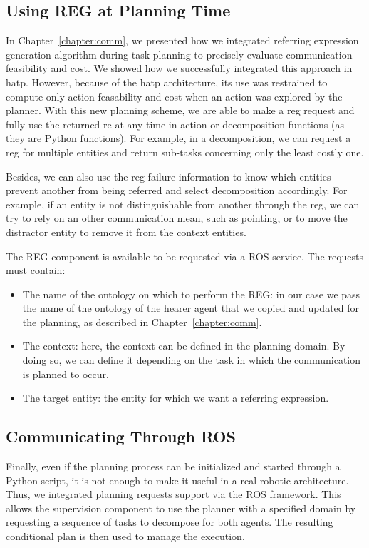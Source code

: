 \documentclass[a4paper,11pt,twoside]{StyleThese}
\begin{document}
\subsection{Using REG at Planning Time}
In Chapter~\ref{chapter:comm}, we presented how we integrated referring expression generation algorithm during task planning to precisely evaluate communication feasibility and cost. We showed how we successfully integrated this approach in \acrshort{hatp}. However, because of the \acrshort{hatp} architecture, its use was restrained to compute only action feasability and cost when an action was explored by the planner.
With this new planning scheme, we are able to make a \acrshort{reg} request and fully use the returned \acrshort{re} at any time in action or decomposition functions (as they are Python functions). For example, in a decomposition, we can request a \acrshort{reg} for multiple entities and return sub-tasks concerning only the least costly one. 

Besides, we can also use the \acrshort{reg} failure information to know which entities prevent another from being referred and select decomposition accordingly. For example, if an entity is not distinguishable from another through the \acrshort{reg}, we can try to rely on an other communication mean, such as pointing, or to move the distractor entity to remove it from the context entities.

The REG component is available to be requested via a ROS service. The requests must contain:
\begin{itemize}
\item The name of the ontology on which to perform the REG: in our case we pass the name of the ontology of the hearer agent that we copied and updated for the planning, as described in Chapter~\ref{chapter:comm}.

\item The context: here, the context can be defined in the planning domain. By doing so, we can define it depending on the task in which the communication is planned to occur.

\item The target entity: the entity for which we want a referring expression.
\end{itemize}

\subsection{Communicating Through ROS}
Finally, even if the planning process can be initialized and started through a Python script, it is not enough to make it useful in a real robotic architecture. Thus, we integrated planning requests support via the ROS framework. This allows the supervision component to use the planner with a specified domain by requesting a sequence of tasks to decompose for both agents. The resulting conditional plan is then used to manage the execution.
\end{document}

